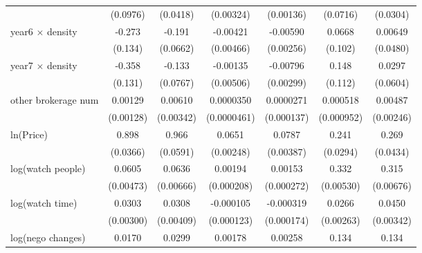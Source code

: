 {\begin{adjustbox}{max width=\textwidth}
\begin{tabular}{l*{6}{c}}
            &    (0.0976)         &    (0.0418)         &   (0.00324)         &   (0.00136)         &    (0.0716)         &    (0.0304)         \\
\addlinespace
year6 $\times$ density&      -0.273\sym{**} &      -0.191\sym{***}&    -0.00421         &    -0.00590\sym{**} &      0.0668         &     0.00649         \\
            &     (0.134)         &    (0.0662)         &   (0.00466)         &   (0.00256)         &     (0.102)         &    (0.0480)         \\
\addlinespace
year7 $\times$ density&      -0.358\sym{***}&      -0.133\sym{*}  &    -0.00135         &    -0.00796\sym{***}&       0.148         &      0.0297         \\
            &     (0.131)         &    (0.0767)         &   (0.00506)         &   (0.00299)         &     (0.112)         &    (0.0604)         \\
\addlinespace
other brokerage num  &     0.00129         &     0.00610\sym{*}  &   0.0000350         &   0.0000271         &    0.000518         &     0.00487\sym{**} \\
            &   (0.00128)         &   (0.00342)         & (0.0000461)         &  (0.000137)         &  (0.000952)         &   (0.00246)         \\
\addlinespace
ln(Price)&       0.898\sym{***}&       0.966\sym{***}&      0.0651\sym{***}&      0.0787\sym{***}&       0.241\sym{***}&       0.269\sym{***}\\
            &    (0.0366)         &    (0.0591)         &   (0.00248)         &   (0.00387)         &    (0.0294)         &    (0.0434)         \\
\addlinespace
log(watch people)&      0.0605\sym{***}&      0.0636\sym{***}&     0.00194\sym{***}&     0.00153\sym{***}&       0.332\sym{***}&       0.315\sym{***}\\
            &   (0.00473)         &   (0.00666)         &  (0.000208)         &  (0.000272)         &   (0.00530)         &   (0.00676)         \\
\addlinespace
log(watch time)&      0.0303\sym{***}&      0.0308\sym{***}&   -0.000105         &   -0.000319\sym{*}  &      0.0266\sym{***}&      0.0450\sym{***}\\
            &   (0.00300)         &   (0.00409)         &  (0.000123)         &  (0.000174)         &   (0.00263)         &   (0.00342)         \\
\addlinespace
log(nego changes)&      0.0170\sym{**} &      0.0299\sym{**} &     0.00178\sym{***}&     0.00258\sym{***}&       0.134\sym{***}&       0.134\sym{***}\\

\end{tabular}
\end{adjustbox}}
